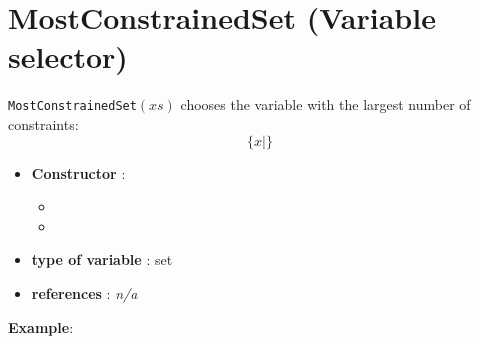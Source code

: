 \section{MostConstrainedSet (Variable selector)}\label{mostconstrainedset:mostconstrainedsetvarselector}\hypertarget{mostconstrainedset:mostconstrainedsetvarselector}{}
\begin{notedef}
  \texttt{MostConstrainedSet}$(xs)$ chooses the variable with the largest number of constraints:
$$\{x | \}$$
\end{notedef}

\begin{itemize}
	\item \textbf{Constructor} : 
	\begin{itemize}
	\item {}
	\item {}
	\end{itemize}	
	\item \textbf{type of variable} : set
	\item \textbf{references} : \emph{n/a}
\end{itemize}

\textbf{Example}:
%

